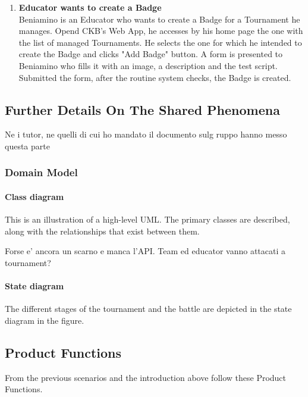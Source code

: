 \begin{enumerate}[label=$\bullet$ \textbf{SC\arabic*:}]
    \item \textbf{Educator wants to create a Badge}\\Beniamino is an Educator who wants to create a Badge for a Tournament he manages. Opend CKB's Web App, he accesses by his home page the one with the list of managed Tournaments.
    He selects the one for which he intended to create the Badge and clicks "Add Badge" button. A form is presented to Beniamino who fills it with an image, a description and the test script. Submitted the form, after the routine system checks, the Badge is created.
\end{enumerate}

\subsection{Further Details On The Shared Phenomena}

Ne i tutor, ne quelli di cui ho mandato il documento sulg ruppo hanno messo questa parte

\newpage

\subsubsection{Domain Model}

\paragraph{Class diagram}
This is an illustration of a high-level UML. The primary classes are described, along with the relationships that exist between them.

Forse e' ancora un scarno e manca l'API. Team ed educator vanno attacati a tournament?

\newpage 

\paragraph{State diagram}
The different stages of the tournament and the battle are depicted in the state diagram in the figure.

\newpage

\subsection{Product Functions}
From the previous scenarios and the introduction above follow these Product Functions.

